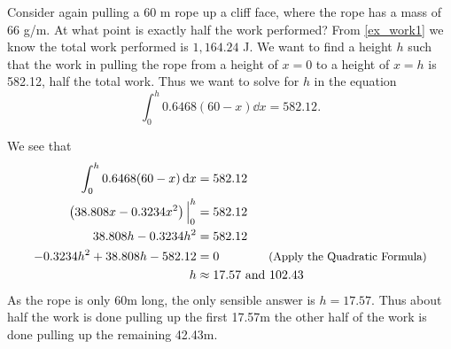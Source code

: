 \begin{example}\label{ex_work1_5}%
Consider again pulling a 60 m rope up a cliff face, where the rope has a mass of 66 g/m. At what point is exactly half the work performed?
\solution
From \autoref{ex_work1} we know the total work performed is $1,164.24$ J. We want to find a height $h$ such that the work in pulling the rope from a height of $x=0$ to a height of $x=h$ is 582.12, half the total work. Thus we want to solve for $h$ in the equation
\[\int_0^h 0.6468(60-x)\dd x = 582.12.\]

We see that
\begin{align*}
	\int_0^h 0.6468(60-x)\operatorname{d}\! x &= 582.12 \\
	\left(38.808x-0.3234x^2\right)\Big|_0^h &=582.12 \\
	38.808h-0.3234h^2 &=582.12 \\
	-0.3234h^2+38.808h-582.12 &=0 \qquad\qquad\text{\small(Apply the Quadratic Formula)} \\
	h&\approx17.57 \ \text{and}\ 102.43
\end{align*}
As the rope is only 60m long, the only sensible answer is $h=17.57$. Thus about half the work is done pulling up the first 17.57m the other half of the work is done pulling up the remaining 42.43m.
\end{example}


